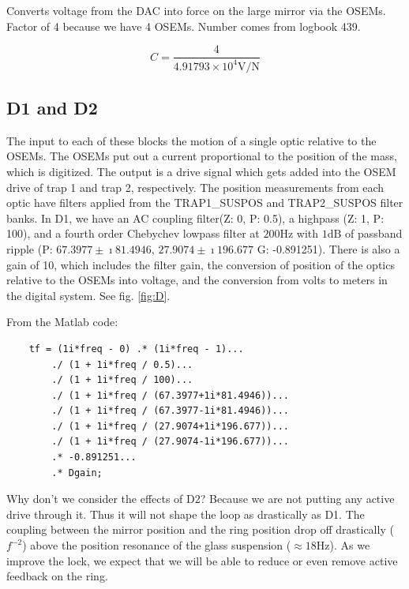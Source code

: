 Converts voltage from the DAC into force on the large mirror via the OSEMs.  Factor of 4 because we have 4 OSEMs.  Number comes from logbook 439.

\begin{equation}
C = \frac{4}{4.91793\times 10^{4}\mbox{V/N}}                               
\label{eq:C}
\end{equation}


\subsection{D1 and D2}
The input to each of these blocks the motion of a single optic relative to the OSEMs. The OSEMs put out a current proportional to the position of the mass, which is digitized.  The output is a drive signal which gets added into the OSEM drive of trap 1 and trap 2, respectively.  The position measurements from each optic have filters applied from the TRAP1\_SUSPOS and TRAP2\_SUSPOS filter banks. In D1, we have an AC coupling filter(Z: 0, P: 0.5), a highpass (Z: 1, P: 100), and a fourth order Chebychev lowpass filter at $200\mbox{Hz}$ with $1\mbox{dB}$ of passband ripple (P: $67.3977\pm\imath81.4946$, $27.9074\pm\imath196.677$ G: -0.891251).  There is also a gain of 10, which includes the filter gain, the conversion of position of the optics relative to the OSEMs into voltage, and the conversion from volts to meters in the digital system. See fig. \ref{fig:D}. 

From the Matlab code:

\begin{verbatim}
    tf = (1i*freq - 0) .* (1i*freq - 1)...
        ./ (1 + 1i*freq / 0.5)...
        ./ (1 + 1i*freq / 100)...
        ./ (1 + 1i*freq / (67.3977+1i*81.4946))...
        ./ (1 + 1i*freq / (67.3977-1i*81.4946))...
        ./ (1 + 1i*freq / (27.9074+1i*196.677))...
        ./ (1 + 1i*freq / (27.9074-1i*196.677))...
        .* -0.891251...
        .* Dgain;
\end{verbatim}


Why don't we consider the effects of D2?  Because we are not putting any active drive through it. Thus it will not shape the loop as drastically as D1. The coupling between the mirror position and the ring position drop off drastically ($f^{-2}$) above the position resonance of the glass suspension ($\approx 18\mbox{Hz}$). As we improve the lock, we expect that we will be able to reduce or even remove active feedback on the ring.

\vspace{30pt}

